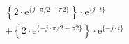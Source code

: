 \[
\begin{split}
&  \left \{ 2 \cdot \textrm{e}^{\{  j \cdot \pi/2 -{\pi}{2}\}} \right \} \cdot \textrm{e}^{\{  j \cdot t \}}\\
&+ \left \{ 2 \cdot \textrm{e}^{\{ -j \cdot \pi/2 -{\pi}{2}\}} \right \} \cdot \textrm{e}^{\{- j \cdot t \}}
\end{split}
\]
